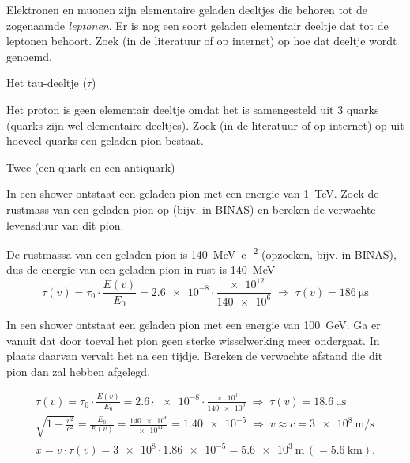 \begin{questions}

\question Elektronen en muonen zijn elementaire geladen deeltjes die behoren tot
de zogenaamde \emph{leptonen}. Er is nog een soort geladen elementair
deeltje dat tot de leptonen behoort. Zoek (in de literatuur of op
internet) op hoe dat deeltje wordt genoemd.
\begin{solution}
Het tau-deeltje ($\tau$)
\end{solution}

\question Het proton is geen elementair deeltje omdat het is samengesteld uit 3
quarks (quarks zijn wel elementaire deeltjes). Zoek (in de literatuur of
op internet) op uit hoeveel quarks een geladen pion bestaat.
\begin{solution}
Twee (een quark en een antiquark)
\end{solution}



\question In een shower ontstaat een geladen pion met een energie van
\SI{1}{\tera\electronvolt}. Zoek de rustmass van een geladen pion op
(bijv. in BINAS) en bereken de verwachte levensduur van dit pion.
\begin{solution}
De rustmassa van een geladen pion is \SI{140}{\mega\electronvolt\per c\squared}
(opzoeken, bijv. in BINAS), dus de energie van een geladen pion in rust
is \SI{140}{\mega\electronvolt}
\begin{equation}
\tau (v) = \tau_0 \cdot \frac{E(v)}{E_0}
= \num{2.6e-8} \cdot \frac{\num{e12}}{\num{140e6}}
\;\Rightarrow\; \tau (v) = \SI{186}{\micro\second} \nonumber
\end{equation}
\end{solution}

\question In een shower ontstaat een geladen pion met een energie van
\SI{100}{\giga\electronvolt}. Ga er vanuit dat door toeval het pion geen
sterke wisselwerking meer ondergaat. In plaats daarvan vervalt het na
een tijdje. Bereken de verwachte afstand die dit pion dan zal hebben
afgelegd.
\begin{solution}
\begin{eqnarray}
    \tau (v) = \tau_0 \cdot \frac{E(v)}{E_0}
    = \num{2.6} \cdot \num{e-8} \cdot \frac{\num{e11}}{\num{140e6}}
    \;\Rightarrow\; \tau (v) = \SI{18.6}{\micro\second} \nonumber \\
    \sqrt{1-\frac{v^2}{c^2}} = \frac{E_0}{E(v)}
    = \frac{\num{140e6}}{\num{e11}} = \num{1.40e-5}
    \;\Rightarrow\; v \approx c = \SI{3e8}{\meter\per\second} \nonumber \\
    x = v \cdot \tau(v) = \num{3e8} \cdot \num{1.86e-5}
    = \SI{5.6e3}{\meter}\, (=\SI{5.6}{\kilo\meter}). \nonumber
\end{eqnarray}
\end{solution}

\end{questions}


